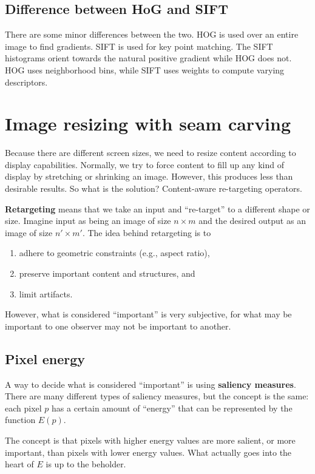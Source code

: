 \documentclass{article}
\begin{document}
\subsection{Difference between HoG and SIFT}
There are some minor differences between the two. HOG is used over an entire image to find gradients. SIFT is used for key point matching. The SIFT histograms orient towards the natural positive gradient while HOG does not. HOG uses neighborhood bins, while SIFT uses weights to compute varying descriptors.

\section{Image resizing with seam carving}
Because there are different screen sizes, we need to resize content according to display capabilities. Normally, we try to force content to fill up any kind of display by stretching or shrinking an image. However, this produces less than desirable results. So what is the solution? Content-aware re-targeting operators.

\textbf{Retargeting} means that we take an input and ``re-target'' to a different shape or size. Imagine input as being an image of size $n \times m$ and the desired output as an image of size $n' \times m'$. The idea behind retargeting is to
\begin{enumerate}
	\item adhere to geometric constraints (e.g., aspect ratio),
	\item preserve important content and structures, and
	\item limit artifacts.
\end{enumerate}
However, what is considered ``important'' is very subjective, for what may be important to one observer may not be important to another.

\subsection{Pixel energy}

A way to decide what is considered ``important'' is using \textbf{saliency measures}. There are many different types of saliency measures, but the concept is the same: each pixel $p$ has a certain amount of ``energy'' that can be represented by the function $E(p)$.

The concept is that pixels with higher energy values are more salient, or more important, than pixels with lower energy values. What actually goes into the heart of $E$ is up to the beholder.
\end{document}
